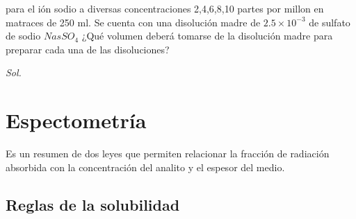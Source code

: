 \begin{problem}
para el ión sodio a diversas concentraciones 2,4,6,8,10 partes por millon en matraces de 250 ml. Se cuenta con una disolución madre de $2.5\times 10^{-3}$ de sulfato de sodio $Na{s}SO_{4}$ ¿Qué volumen deberá tomarse de la disolución madre para preparar cada una de las disoluciones?
\end{problem}

\textit{ Sol. }

\section{Espectometría}

\begin{definition}
	Es un resumen de dos leyes que permiten relacionar la fracción de radiación absorbida con la concentración del analito y el espesor del medio.
\end{definition}

\subsection{Reglas de la solubilidad}

